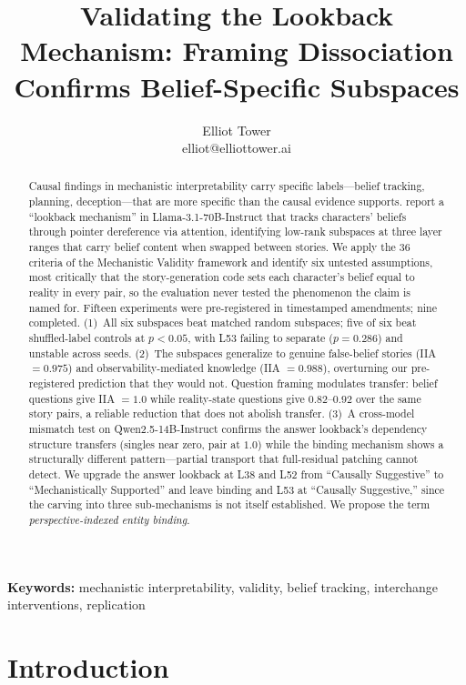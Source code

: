 \documentclass{article}
\title{Validating the Lookback Mechanism: Framing Dissociation Confirms Belief-Specific Subspaces}
\author{\name Elliot Tower \\
      \email elliot@elliottower.ai}
\begin{document}
\maketitle

\begin{abstract}
Causal findings in mechanistic interpretability carry specific labels---belief tracking, planning, deception---that are more specific than the causal evidence supports. \citet{prakash2025lookback} report a ``lookback mechanism'' in Llama-3.1-70B-Instruct that tracks characters' beliefs through pointer dereference via attention, identifying low-rank subspaces at three layer ranges that carry belief content when swapped between stories. We apply the 36 criteria of the Mechanistic Validity framework and identify six untested assumptions, most critically that the story-generation code sets each character's belief equal to reality in every pair, so the evaluation never tested the phenomenon the claim is named for. Fifteen experiments were pre-registered in timestamped amendments; nine completed. (1)~All six subspaces beat matched random subspaces; five of six beat shuffled-label controls at $p < 0.05$, with L53 failing to separate ($p = 0.286$) and unstable across seeds. (2)~The subspaces generalize to genuine false-belief stories (IIA $= 0.975$) and observability-mediated knowledge (IIA $= 0.988$), overturning our pre-registered prediction that they would not. Question framing modulates transfer: belief questions give IIA $= 1.0$ while reality-state questions give $0.82$--$0.92$ over the same story pairs, a reliable reduction that does not abolish transfer. (3)~A cross-model mismatch test on Qwen2.5-14B-Instruct confirms the answer lookback's dependency structure transfers (singles near zero, pair at $1.0$) while the binding mechanism shows a structurally different pattern---partial transport that full-residual patching cannot detect. We upgrade the answer lookback at L38 and L52 from ``Causally Suggestive'' to ``Mechanistically Supported'' and leave binding and L53 at ``Causally Suggestive,'' since the carving into three sub-mechanisms is not itself established. We propose the term \emph{perspective-indexed entity binding}.
\end{abstract}

\noindent\textbf{Keywords:} mechanistic interpretability, validity, belief tracking, interchange interventions, replication


\section{Introduction}
\label{sec:intro}
\end{document}

